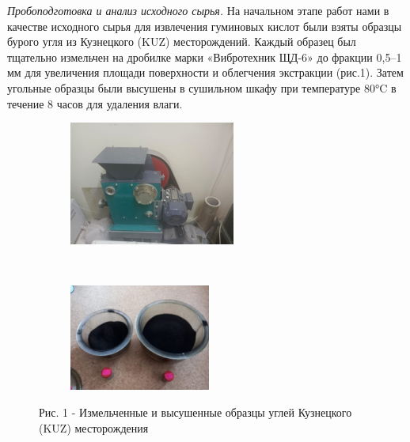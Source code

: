\begin{multicols}{2}
\emph{Пробоподготовка и анализ исходного сырья.} На начальном этапе
работ нами в качестве исходного сырья для извлечения гуминовых кислот
были взяты образцы бурого угля из Кузнецкого (KUZ) месторождений. Каждый
образец был тщательно измельчен на дробилке марки «Вибротехник ЩД-6» до
фракции 0,5--1 мм для увеличения площади поверхности и облегчения
экстракции (рис.1). Затем угольные образцы были высушены в сушильном
шкафу при температуре 80°C в течение 8 часов для удаления влаги.
\end{multicols}

\begin{figure}[H]
    \centering
    \begin{subfigure}[b]{0.45\textwidth}
        \centering
        \includegraphics[width=\textwidth]{media/gorn3/image2}
    \end{subfigure}
    ~
    \begin{subfigure}[b]{0.45\textwidth}
        \centering
        \includegraphics[width=\textwidth]{media/gorn3/image3}
    \end{subfigure}
    \caption*{Рис. 1 - Измельченные и высушенные образцы углей Кузнецкого (KUZ) месторождения}
\end{figure}


